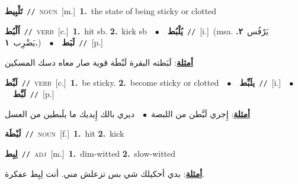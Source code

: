 \documentclass[10pt,a4paper,twoside]{article} %
\begin{document}
\begin{multicols}{2}
{{{{{{{{{{\setlength\topsep{0pt}\textbf{\foreignlanguage{arabic}{تَلْبِيط}}\ {\color{gray}\texttt{//}\color{black}}\ \textsc{noun}\ [m.]\ \textbf{1.}~the state of being sticky or clotted\ 

{\setlength\topsep{0pt}\textbf{\foreignlanguage{arabic}{اُلْبُط}}\ {\color{gray}\texttt{//}\color{black}}\ \textsc{verb}\ [c.]\ \textbf{1.}~hit sb.  \textbf{2.}~kick sb\ \ $\bullet$\ \ \setlength\topsep{0pt}\textbf{\foreignlanguage{arabic}{يُلْبُط}}\ {\color{gray}\texttt{//}\color{black}}\ [i.]\ \color{gray}(msa. \foreignlanguage{arabic}{يَرْفُس}~\foreignlanguage{arabic}{\textbf{٢.}}  \foreignlanguage{arabic}{يَضْرِب}~\foreignlanguage{arabic}{\textbf{١.}})\color{black}\ \ $\bullet$\ \ \setlength\topsep{0pt}\textbf{\foreignlanguage{arabic}{لَبَط}}\ {\color{gray}\texttt{//}\color{black}}\ [p.]\  \begin{flushright}\color{gray}\foreignlanguage{arabic}{\textbf{\underline{\foreignlanguage{arabic}{أمثلة}}}: لَبَطته البقرة لَبْطَة قوية صار معاه دسك المسكين}\end{flushright}\color{black}} \vspace{2mm}

{\setlength\topsep{0pt}\textbf{\foreignlanguage{arabic}{لَبِّط}}\ {\color{gray}\texttt{//}\color{black}}\ \textsc{verb}\ [c.]\ \textbf{1.}~be sticky.  \textbf{2.}~become sticky or clotted\ \ $\bullet$\ \ \setlength\topsep{0pt}\textbf{\foreignlanguage{arabic}{يلَبِّط}}\ {\color{gray}\texttt{//}\color{black}}\ [i.]\ \ $\bullet$\ \ \setlength\topsep{0pt}\textbf{\foreignlanguage{arabic}{لَبَّط}}\ {\color{gray}\texttt{//}\color{black}}\ [p.]\  \begin{flushright}\color{gray}\foreignlanguage{arabic}{\textbf{\underline{\foreignlanguage{arabic}{أمثلة}}}: إِجري لَبَّطن من اللبصة\ $\bullet$\ \  ديري بالك إِيديك ما يلَبطين من العسل}\end{flushright}\color{black}} \vspace{2mm}

{\setlength\topsep{0pt}\textbf{\foreignlanguage{arabic}{لَبْطَة}}\ {\color{gray}\texttt{//}\color{black}}\ \textsc{noun}\ [f.]\ \textbf{1.}~hit  \textbf{2.}~kick\ 

{\setlength\topsep{0pt}\textbf{\foreignlanguage{arabic}{لِبِط}}\ {\color{gray}\texttt{//}\color{black}}\ \textsc{adj}\ [m.]\ \textbf{1.}~dim-witted  \textbf{2.}~slow-witted\  \begin{flushright}\color{gray}\foreignlanguage{arabic}{\textbf{\underline{\foreignlanguage{arabic}{أمثلة}}}: بدي أحكيلك شي بس تزعلش مني. أنت لِبِط عفكرة.}\end{flushright}\color{black}} \vspace{2mm}

}}}}}}}}}}}
\end{multicols}
\end{document}
